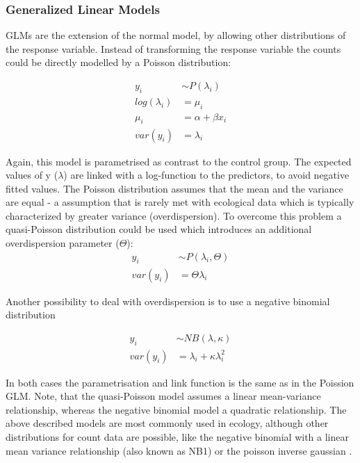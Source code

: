 \documentclass{scrartcl}
\begin{document}
\subsubsection{Generalized Linear Models}
GLMs are the extension of the normal model, by allowing other distributions of the response variable.
Instead of transforming the response variable the counts could be directly modelled by a Poisson distribution:

\begin{align}
  y_i &\sim P(\lambda_i) \nonumber \\
  log(\lambda_i) &= \mu_i \label{eqn:pois} \\
  \mu_i &= \alpha + \beta x_i \nonumber \\
  var(y_i) &= \lambda_i \nonumber
\end{align}

Again, this model is parametrised as contrast to the control group. 
The expected values of y ($\lambda$) are linked with a log-function to the predictors, to avoid negative fitted values. 
The Poisson distribution assumes that the mean and the variance are equal - a assumption that is rarely met with ecological data which is typically characterized by greater variance (overdispersion).
To overcome this problem a quasi-Poisson distribution could be used which introduces an additional overdispersion parameter ($\Theta$):
\begin{align}
  y_i &\sim P(\lambda_i, \Theta) \label{eqn:quasi} \\
  var(y_i) &= \Theta \lambda_i  \nonumber
\end{align}

Another possibility to deal with overdispersion is to use a negative binomial distribution

\begin{align}
  y_i &\sim NB(\lambda, \kappa) \label{eqn:negbin}  \\
  var(y_i) &= \lambda_i + \kappa \lambda_i^2 \nonumber
\end{align}

In both cases the parametrisation and link function is the same as in the Poission GLM.
Note, that the quasi-Poisson model assumes a linear mean-variance relationship, whereas the negative binomial model a quadratic relationship.
The above described models are most commonly used in ecology, although other distributions for count data are possible, like the negative binomial with a linear mean variance relationship (also known as NB1) or the poisson inverse gaussian \citep{hilbe_modeling_2014}.
\end{document}
